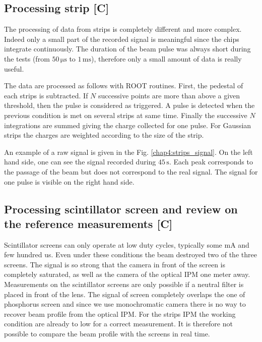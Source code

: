 \begin{refsection}
  

  \subsection{Processing strip [C]}
  The processing of data from strips is completely different and more complex. Indeed only a small part of the recorded signal is meaningful since the chips integrate continuously. The duration of the beam pulse was always short during the tests (from $50\,\mathrm{\mu s}$ to $1\,\mathrm{ms}$), therefore only a small amount of data is really useful.

  The data are processed as follows with ROOT\cite{Brun1997,Antcheva2009} routines. First, the pedestal of each strips is subtracted. If $N$ successive points are more than above a given threshold, then the pulse is considered as triggered. A pulse is detected when the previous condition is met on several strips at same time. Finally the successive $N$ integrations are summed giving the charge collected for one pulse. For Gaussian strips the charges are weighted according to the size of the strip.

  An example of a raw signal is given in the Fig. \ref{chap4:strips_signal}. On the left hand side, one can see the signal recorded during $45\,\mathrm{s}$. Each peak corresponds to the passage of the beam but does not correspond to the real signal. The signal for one pulse is visible on the right hand side.

  


  \subsection{Processing scintillator screen and review on the reference measurements [C]}
  Scintillator screens can only operate at low duty cycles, typically some mA and few hundred us. Even under these conditions the beam destroyed two of the three screens. The signal is so strong that the camera in front of the screen is completely saturated, as well as the camera of the optical IPM one meter away. Measurements on the scintillator screens are only possible if a neutral filter is placed in front of the lens. The signal of screen completely overlaps the one of phosphorus screen and since we use monochromatic camera there is no way to recover beam profile from the optical IPM. For the strips IPM the working condition are already to low for a correct measurement. It is therefore not possible to compare the beam profile with the screens in real time.
  


\end{refsection}
